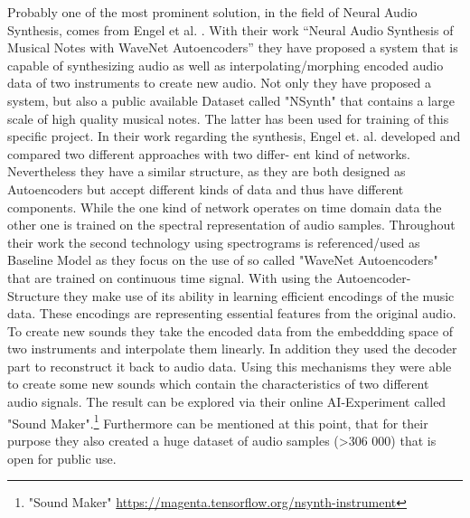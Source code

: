 Probably one of the most prominent solution, in the field of Neural Audio Synthesis, comes from Engel et al. \cite{Engel2017}. With their work “Neural Audio Synthesis of Musical Notes with WaveNet Autoencoders” they have proposed a system that is capable of synthesizing audio as well as interpolating/morphing encoded audio data of two instruments to create new audio. Not only they have proposed a system, but also a public available Dataset called "NSynth" that contains a large scale of high quality musical notes. The latter has been used for training of this specific project. In their work regarding the synthesis, Engel et. al. developed and compared two different approaches with two differ- ent kind of networks. Nevertheless they have a similar structure, as they are both designed as Autoencoders but accept different kinds of data and thus have different components. While the one kind of network operates on time domain data the other one is trained on the spectral representation of audio samples. Throughout their work the second technology using spectrograms is referenced/used as Baseline Model as they focus on the use of so called "WaveNet Autoencoders" that are trained on continuous time signal. With using the Autoencoder-Structure they make use of its ability in learning efficient encodings of the music data. These encodings are representing essential features from the original audio. To create new sounds they take the encoded data from the embeddding space of two instruments and interpolate them linearly. In addition they used the decoder part to reconstruct it back to audio data. Using this mechanisms they were able to create some new sounds which contain the characteristics of two different audio signals. The result can be explored via their online AI-Experiment called "Sound Maker".\footnote{"Sound Maker" \url{https://magenta.tensorflow.org/nsynth-instrument}} Furthermore can be mentioned at this point, that for their purpose they also created a huge dataset of audio samples (>306 000) that is open for public use.\\

